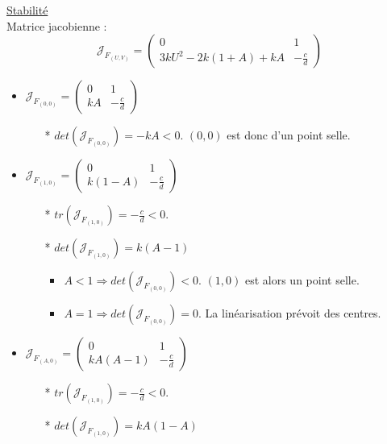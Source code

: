 \documentclass[a4paper,11pt]{article}
\begin{document}
\vspace{0.5cm}
\underline{Stabilité}\\
Matrice jacobienne : $$\mathcal{J}_{F_{(U,V)}}=\begin{pmatrix} 0 & 1 \\ 3kU^2-2k(1+A)+kA & -\frac{c}{d}\end{pmatrix}$$
\newline
\begin{itemize}[label=$\bullet$]
	\item$\mathcal{J}_{F_{(0,0)}}=\begin{pmatrix} 0 & 1 \\ kA & -\frac{c}{d} \end{pmatrix}$\\
    \begin{itemize}
		\item[*] $det (\mathcal{J}_{F_{(0,0)}}) = -kA <0$. $(0,0)$ est donc d'un point selle.
	\end{itemize}
    \item $\mathcal{J}_{F_{(1,0)}}=\begin{pmatrix} 0 & 1 \\ k(1-A) & -\frac{c}{d} \end{pmatrix}$\\
    \begin{itemize}
		\item[*] $tr (\mathcal{J}_{F_{(1,0)}})= -\frac{c}{d} <0$. 
        \item[*] $det (\mathcal{J}_{F_{(1,0)}}) = k(A-1)$
        \begin{itemize}[label=$\blacktriangleright$]
			\item $A<1 \Rightarrow det (\mathcal{J}_{F_{(0,0)}})<0$. $(1,0)$ est alors un point selle.
            \item $A=1 \Rightarrow det (\mathcal{J}_{F_{(0,0)}})=0$. La linéarisation prévoit des centres.
		\end{itemize}
	\end{itemize}
    \item $\mathcal{J}_{F_{(A,0)}}=\begin{pmatrix} 0 & 1 \\ kA(A-1) & -\frac{c}{d} \end{pmatrix}$\\
    \begin{itemize}
		\item[*] $tr (\mathcal{J}_{F_{(1,0)}})= -\frac{c}{d} <0$. 
        \item[*] $det (\mathcal{J}_{F_{(1,0)}}) = kA(1-A)$

\end{itemize}
\end{itemize}
\end{document}
